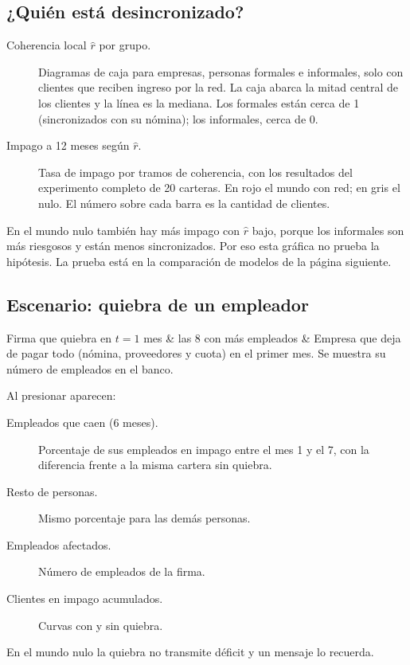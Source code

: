 
\subsection*{¿Quién está desincronizado?}
\begin{description}
\item[Coherencia local $\hat r$ por grupo.] Diagramas de caja para empresas, personas
formales e informales, solo con clientes que reciben ingreso por la red. La caja abarca la
mitad central de los clientes y la línea es la mediana. Los formales están cerca de 1
(sincronizados con su nómina); los informales, cerca de 0.
\item[Impago a 12 meses según $\hat r$.] Tasa de impago por tramos de coherencia, con los
resultados del experimento completo de 20 carteras. En rojo el mundo con red; en gris el
nulo. El número sobre cada barra es la cantidad de clientes.
\end{description}

\begin{aviso}
En el mundo nulo también hay más impago con $\hat r$ bajo, porque los informales son más
riesgosos y están menos sincronizados. Por eso esta gráfica no prueba la hipótesis. La
prueba está en la comparación de modelos de la página siguiente.
\end{aviso}

\subsection*{Escenario: quiebra de un empleador}
\begin{controles}
Firma que quiebra en $t=1$ mes & las 8 con más empleados & Empresa que deja de pagar todo
(nómina, proveedores y cuota) en el primer mes. Se muestra su número de empleados en el
banco. \\
\end{controles}
Al presionar  aparecen:
\begin{description}
\item[Empleados que caen (6 meses).] Porcentaje de sus empleados en impago entre el mes 1
y el 7, con la diferencia frente a la misma cartera sin quiebra.
\item[Resto de personas.] Mismo porcentaje para las demás personas.
\item[Empleados afectados.] Número de empleados de la firma.
\item[Clientes en impago acumulados.] Curvas con y sin quiebra.
\end{description}
En el mundo nulo la quiebra no transmite déficit y un mensaje lo recuerda.


